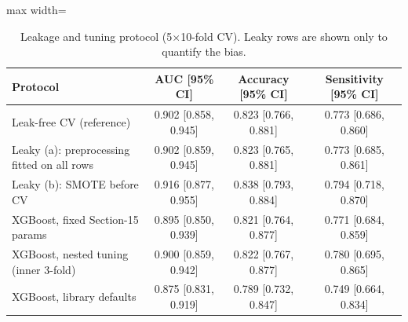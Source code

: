 \begin{table}[!t]
\centering
\scriptsize
\caption{Leakage and tuning protocol (5$\times$10-fold CV). Leaky rows are shown only to quantify the bias.}
\label{tab:e4}
\setlength{\tabcolsep}{3pt}
\begin{adjustbox}{max width=\linewidth}
\begin{tabular}{lccc}
\toprule
Protocol & AUC [95\% CI] & Accuracy [95\% CI] & Sensitivity [95\% CI] \\
\midrule
Leak-free CV (reference) & 0.902 [0.858, 0.945] & 0.823 [0.766, 0.881] & 0.773 [0.686, 0.860] \\
Leaky (a): preprocessing fitted on all rows & 0.902 [0.859, 0.945] & 0.823 [0.765, 0.881] & 0.773 [0.685, 0.861] \\
Leaky (b): SMOTE before CV & 0.916 [0.877, 0.955] & 0.838 [0.793, 0.884] & 0.794 [0.718, 0.870] \\
XGBoost, fixed Section-15 params & 0.895 [0.850, 0.939] & 0.821 [0.764, 0.877] & 0.771 [0.684, 0.859] \\
XGBoost, nested tuning (inner 3-fold) & 0.900 [0.859, 0.942] & 0.822 [0.767, 0.877] & 0.780 [0.695, 0.865] \\
XGBoost, library defaults & 0.875 [0.831, 0.919] & 0.789 [0.732, 0.847] & 0.749 [0.664, 0.834] \\
\bottomrule
\end{tabular}
\end{adjustbox}
\end{table}
